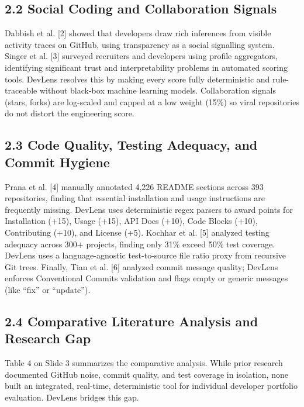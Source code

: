 \documentclass[12pt,a4paper]{article}
\begin{document}
\subsection{2.2 Social Coding and Collaboration Signals}
Dabbish et al. [2] showed that developers draw rich inferences from visible activity traces on GitHub, using transparency as a social signalling system. Singer et al. [3] surveyed recruiters and developers using profile aggregators, identifying significant trust and interpretability problems in automated scoring tools. DevLens resolves this by making every score fully deterministic and rule-traceable without black-box machine learning models. Collaboration signals (stars, forks) are log-scaled and capped at a low weight (15\%) so viral repositories do not distort the engineering score.

\subsection{2.3 Code Quality, Testing Adequacy, and Commit Hygiene}
Prana et al. [4] manually annotated 4,226 README sections across 393 repositories, finding that essential installation and usage instructions are frequently missing. DevLens uses deterministic regex parsers to award points for Installation (+15), Usage (+15), API Docs (+10), Code Blocks (+10), Contributing (+10), and License (+5). Kochhar et al. [5] analyzed testing adequacy across 300+ projects, finding only 31\% exceed 50\% test coverage. DevLens uses a language-agnostic test-to-source file ratio proxy from recursive Git trees. Finally, Tian et al. [6] analyzed commit message quality; DevLens enforces Conventional Commits validation and flags empty or generic messages (like ``fix'' or ``update'').

\subsection{2.4 Comparative Literature Analysis and Research Gap}
Table 4 on Slide 3 summarizes the comparative analysis. While prior research documented GitHub noise, commit quality, and test coverage in isolation, none built an integrated, real-time, deterministic tool for individual developer portfolio evaluation. DevLens bridges this gap.

\newpage
\thispagestyle{fancy}
\end{document}
